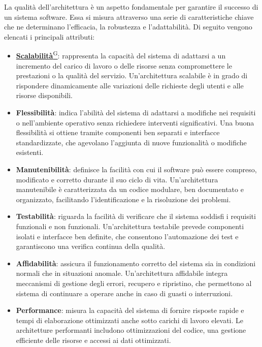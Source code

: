 La qualità dell'architettura è un aspetto fondamentale per garantire il successo di un sistema software. Essa si misura attraverso una serie di caratteristiche chiave che ne determinano l'efficacia, la robustezza e l'adattabilità. Di seguito vengono elencati i principali attributi:
\begin{itemize}
    \item \href{https://code7crusaders.github.io/docs/RTB/documentazione_interna/glossario.html#scalabilità}{\textbf{Scalabilità}\textsuperscript{G}}: rappresenta la capacità del sistema di adattarsi a un incremento del carico di lavoro o delle risorse senza compromettere le prestazioni o la qualità del servizio. Un'architettura scalabile è in grado di rispondere dinamicamente alle variazioni delle richieste degli utenti e alle risorse disponibili.
    \item \textbf{Flessibilità}: indica l'abilità del sistema di adattarsi a modifiche nei requisiti o nell'ambiente operativo senza richiedere interventi significativi. Una buona flessibilità si ottiene tramite componenti ben separati e interfacce standardizzate, che agevolano l'aggiunta di nuove funzionalità o modifiche esistenti.
    \item \textbf{Manutenibilità}: definisce la facilità con cui il software può essere compreso, modificato e corretto durante il suo ciclo di vita. Un'architettura manutenibile è caratterizzata da un codice modulare, ben documentato e organizzato, facilitando l'identificazione e la risoluzione dei problemi.
    \item \textbf{Testabilità}: riguarda la facilità di verificare che il sistema soddisfi i requisiti funzionali e non funzionali. Un'architettura testabile prevede componenti isolati e interfacce ben definite, che consentono l'automazione dei test e garantiscono una verifica continua della qualità.
    \item \textbf{Affidabilità}: assicura il funzionamento corretto del sistema sia in condizioni normali che in situazioni anomale. Un'architettura affidabile integra meccanismi di gestione degli errori, recupero e ripristino, che permettono al sistema di continuare a operare anche in caso di guasti o interruzioni.
    \item \textbf{Performance}: misura la capacità del sistema di fornire risposte rapide e tempi di elaborazione ottimizzati anche sotto carichi di lavoro elevati. Le architetture performanti includono ottimizzazioni del codice, una gestione efficiente delle risorse e accessi ai dati ottimizzati.

\end{itemize}
